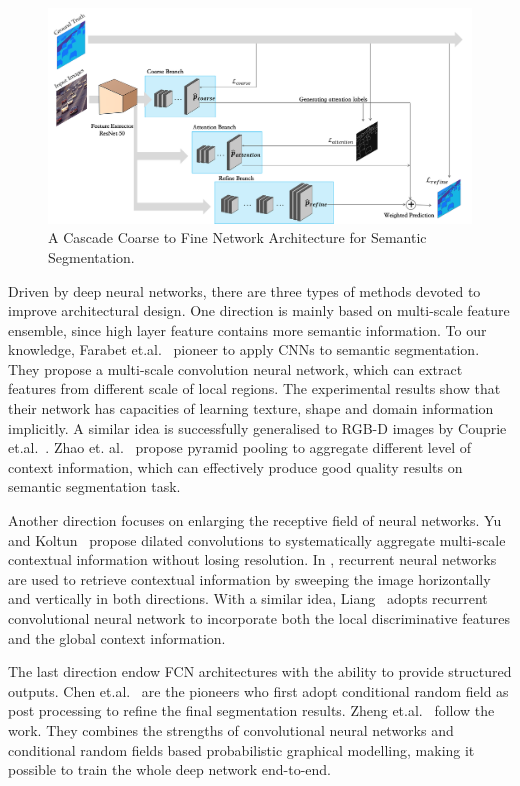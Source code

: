 \documentclass[10.5pt,compsoc]{TsT}
\newcommand{\upcite}[1]{\superscript{\textsuperscript{\cite{#1}}}}
\theoremstyle{mystyle}
\newcommand{\upcite}[1]{\textsuperscript{\cite{#1}}}
\begin{document}
{\begin{figure}[!ht]
\centering
\includegraphics[width=1.9\columnwidth]{fig2.png}
\caption{A Cascade Coarse to Fine Network Architecture for Semantic Segmentation.}
\label{fig2}
\end{figure} 

Driven by deep neural networks, there are three types of methods devoted to improve architectural design. One direction is mainly based on multi-scale feature ensemble, since high layer feature contains more semantic information. To our knowledge,  Farabet et.al.~\upcite{11}  pioneer to apply CNNs to semantic segmentation. They propose a multi-scale convolution neural network, which can extract features from different scale of local regions. The experimental results show that their network has capacities of learning texture, shape and domain information implicitly. A similar idea is successfully generalised to RGB-D images by Couprie et.al.~\upcite{12}. Zhao et. al.~\upcite{21} propose pyramid pooling to aggregate different level of context information, which can effectively produce good quality results on semantic segmentation task.

Another direction focuses on enlarging the receptive field of neural networks. Yu and Koltun~\upcite{29} propose dilated convolutions to systematically aggregate multi-scale contextual information without losing resolution. In \cite{30}, recurrent neural networks are used to retrieve contextual information by sweeping the image horizontally and vertically in both directions. With a similar idea, Liang~\upcite{24} adopts recurrent convolutional neural network to incorporate both the local discriminative features and the global context information.

The last direction endow FCN architectures with the ability to provide structured outputs. 
Chen et.al.~\upcite{31} are the pioneers who first adopt  conditional random field  as post processing to refine the final segmentation results. Zheng et.al.~\upcite{32} follow the work. They combines
the strengths of convolutional neural networks and conditional random fields based probabilistic graphical modelling, making it possible to train the whole deep network end-to-end.

}
\end{document}
